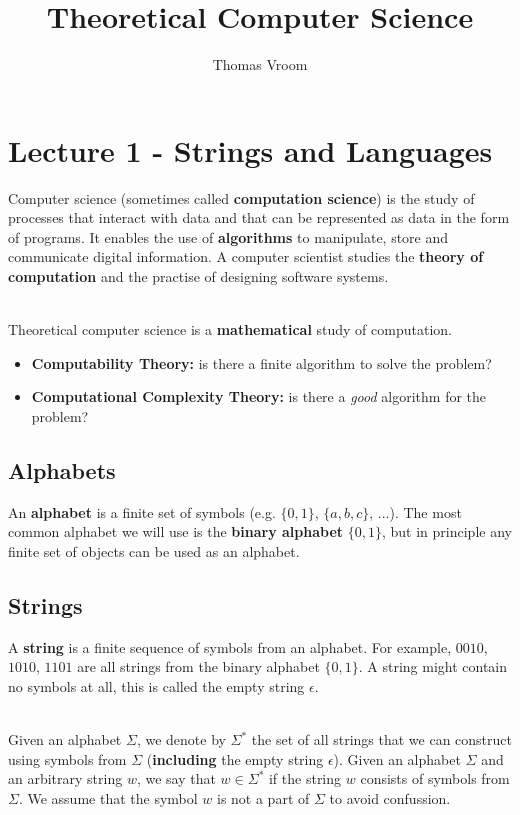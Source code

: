 \documentclass[12pt]{article}
\title{Theoretical Computer Science}
\author{Thomas Vroom}
\begin{document}
\maketitle

%
%
\section*{Lecture 1 - Strings and Languages}
Computer science (sometimes called \textbf{computation science}) is the study of processes that interact with data and that can be represented as data in the form of programs.
It enables the use of \textbf{algorithms} to manipulate, store and communicate digital information.
A computer scientist studies the \textbf{theory of computation} and the practise of designing software systems.

\noindent
\\
Theoretical computer science is a \textbf{mathematical} study of computation.

\begin{itemize}
    \item \textbf{Computability Theory:} is there a finite algorithm to solve the problem?
    \item \textbf{Computational Complexity Theory:} is there a \textit{good} algorithm for the problem?
\end{itemize}

\subsection*{Alphabets}
An \textbf{alphabet} is a finite set of symbols (e.g. $\{ 0, 1 \}$, $\{ a, b, c \}$, ...).
The most common alphabet we will use is the \textbf{binary alphabet} $\{ 0, 1 \}$, but in principle any finite set of objects can be used as an alphabet.

\subsection*{Strings}
A \textbf{string} is a finite sequence of symbols from an alphabet.
For example, $0010$, $1010$, $1101$ are all strings from the binary alphabet $\{ 0, 1 \}$.
A string might contain no symbols at all, this is called the empty string $\epsilon$.

\noindent
\\
Given an alphabet $\Sigma$, we denote by $\Sigma^*$ the set of all strings that we can construct using symbols from $\Sigma$ (\textbf{including} the empty string $\epsilon$).
Given an alphabet $\Sigma$ and an arbitrary string $w$, we say that $w \in \Sigma^*$ if the string $w$ consists of symbols from $\Sigma$.
We assume that the symbol $w$ is not a part of $\Sigma$ to avoid confussion.
\end{document}
